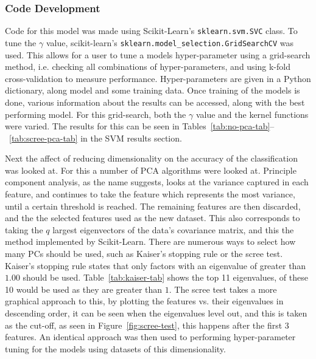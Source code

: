 \documentclass[12pt,a4paper,titlepage,twoside]{report}
\begin{document}
\subsubsection*{Code Development}
	Code for this model was made using Scikit-Learn's \texttt{sklearn.svm.SVC} class. To tune the $\gamma$ value, scikit-learn's \texttt{sklearn.model_selection.GridSearchCV} was used. This allows for a user to tune a models hyper-parameter using a grid-search method, i.e. checking all combinations of hyper-parameters, and using k-fold cross-validation to measure performance. Hyper-parameters are given in a Python dictionary, along model and some training data. Once training of the models is done, various information about the results can be accessed, along with the best performing model. For this grid-search, both the $\gamma$ value and the kernel functions were varied. The results for this can be seen in Tables~\ref{tab:no-pca-tab}--~\ref{tab:scree-pca-tab} in the SVM results section. \par
	Next the affect of reducing dimensionality on the accuracy of the classification was looked at. For this a number of PCA algorithms were looked at. Principle component analysis, as the name suggests, looks at the variance captured in each feature, and continues to take the feature which represents the most variance, until a certain threshold is reached\cite{pca}. The remaining features are then discarded, and the the selected features used as the new dataset. This also corresponds to taking the $q$ largest eigenvectors of the data's covariance matrix, and this the method implemented by Scikit-Learn. There are numerous ways to select how many PCs should be used, such as Kaiser's stopping rule or the scree test\cite{pca-choosing}. Kaiser's stopping rule states that only factors with an eigenvalue of greater than $1.00$ should be used. Table~\ref{tab:kaiser-tab} shows the top 11 eigenvalues, of these 10 would be used as they are greater than $1$. The scree test takes a more graphical approach to this, by plotting the features vs. their eigenvalues in descending order, it can be seen when the eigenvalues level out, and this is taken as the cut-off, as seen in Figure~\ref{fig:scree-test}, this happens after the first 3 features. An identical approach was then used to performing hyper-parameter tuning for the models using datasets of this dimensionality.\\
\end{document}
